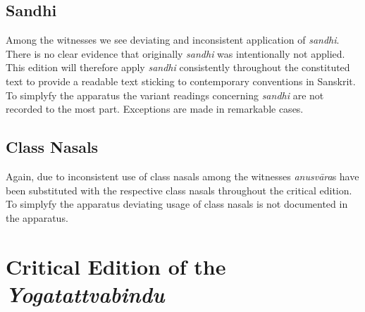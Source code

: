 \documentclass[12pt]{article}%
\begin{document}
\subsection{Sandhi}

Among the witnesses we see deviating and inconsistent application of \textit{sandhi}. There is no clear evidence that originally \textit{sandhi} was intentionally not applied. This edition will therefore apply \textit{sandhi} consistently throughout the constituted text to provide a readable text sticking to contemporary conventions in Sanskrit. To simplyfy the apparatus the variant readings concerning \textit{sandhi} are not recorded to the most part. Exceptions are made in remarkable cases. 

\subsection{Class Nasals}

Again, due to inconsistent use of class nasals among the witnesses \textit{anusvāra}s have been substituted with the respective class nasals throughout the critical edition. To simplyfy the apparatus deviating usage of class nasals is not documented in the apparatus.
\clearpage

\section{Critical Edition of the \textit{Yogatattvabindu}}
  
\end{document}
